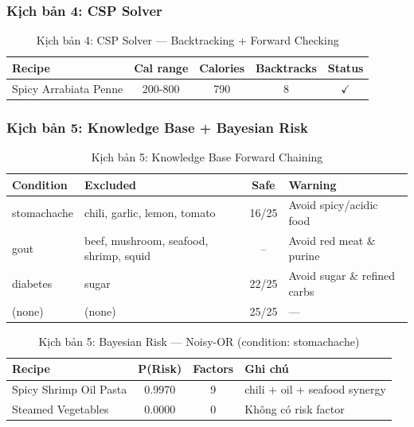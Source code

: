 \subsubsection{Kịch bản 4: CSP Solver}

\begin{table}[H]
\centering
\small
\begin{tabular}{|l|c|c|c|c|}
\hline
\textbf{Recipe} & \textbf{Cal range} & \textbf{Calories} & \textbf{Backtracks} & \textbf{Status} \\
\hline
Spicy Arrabiata Penne & 200-800 & 790 & 8 & $\checkmark$ \\
\hline
\end{tabular}
\caption{Kịch bản 4: CSP Solver --- Backtracking + Forward Checking}
\label{tab:exp_csp}
\end{table}

\subsubsection{Kịch bản 5: Knowledge Base + Bayesian Risk}

\begin{table}[H]
\centering
\small
\begin{tabular}{|l|l|c|l|}
\hline
\textbf{Condition} & \textbf{Excluded} & \textbf{Safe} & \textbf{Warning} \\
\hline
stomachache & chili, garlic, lemon, tomato & 16/25 & Avoid spicy/acidic food \\
\hline
gout & beef, mushroom, seafood, shrimp, squid & -- & Avoid red meat \& purine \\
\hline
diabetes & sugar & 22/25 & Avoid sugar \& refined carbs \\
\hline
(none) & (none) & 25/25 & --- \\
\hline
\end{tabular}
\caption{Kịch bản 5: Knowledge Base Forward Chaining}
\label{tab:exp_kb}
\end{table}

\begin{table}[H]
\centering
\small
\begin{tabular}{|l|c|c|l|}
\hline
\textbf{Recipe} & \textbf{P(Risk)} & \textbf{Factors} & \textbf{Ghi chú} \\
\hline
Spicy Shrimp Oil Pasta & 0.9970 & 9 & chili + oil + seafood synergy \\
\hline
Steamed Vegetables & 0.0000 & 0 & Không có risk factor \\
\hline
\end{tabular}
\caption{Kịch bản 5: Bayesian Risk --- Noisy-OR (condition: stomachache)}
\label{tab:exp_bayes}
\end{table}

